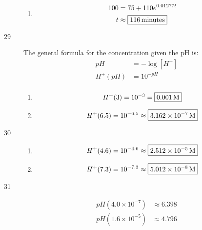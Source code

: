 \documentclass{exam}
\begin{document}
\begin{description}
\begin{enumerate}[a]
          \item
            \begin{align*}
              100 & = 75 + 110 e^{0.01277 t} \\
              t   & \approx \boxed{\unit[116]{minutes}} \\
            \end{align*}
        \end{enumerate}

      \item[29]
        The general formula for the concentration given the pH is:
        \begin{align*}
          pH      & = - \log[H^+] \\
          H^+(pH) & = 10^{-pH} \\
        \end{align*}

        \begin{enumerate}[a]
          \item 
            \[
              H^+(3) = 10^{-3} = \boxed{\unit[0.001]{M}} \\
            \]

          \item 
            \[
              H^+(6.5) = 10^{-6.5} \approx \boxed{\unit[3.162 \times 10^{-7}]{M}} \\
            \]

        \end{enumerate}

      \item[30]
        \begin{enumerate}[a]
          \item 
            \[
              H^+(4.6) = 10^{-4.6} \approx \boxed{\unit[2.512 \times 10^{-5}]{M}} \\
            \]

          \item 
            \[
              H^+(7.3) = 10^{-7.3} \approx \boxed{\unit[5.012 \times 10^{-8}]{M}} \\
            \]

        \end{enumerate}

      \item[31]
        \begin{align*}
          pH(4.0 \times 10^{-7}) & \approx \boxed{6.398} \\
          pH(1.6 \times 10^{-5}) & \approx \boxed{4.796} \\
        \end{align*}


\end{description}
\end{document}
